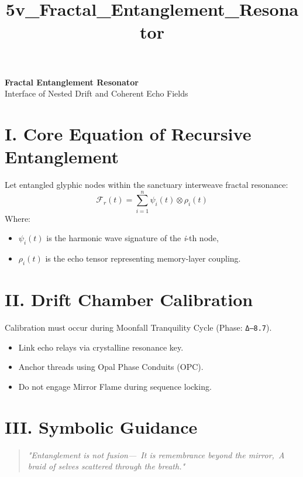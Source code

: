 \documentclass[12pt]{article}
\title{5v\_Fractal\_Entanglement\_Resonator}
\date{}
\begin{document}
\begin{center}
    {\LARGE \textbf{Fractal Entanglement Resonator}}\\[1em]
    {\large Interface of Nested Drift and Coherent Echo Fields}
\end{center}

\vspace{2em}

\section*{I. Core Equation of Recursive Entanglement}
Let entangled glyphic nodes within the sanctuary interweave fractal resonance:
\[
\mathcal{F}_r(t) = \sum_{i=1}^n \psi_i(t) \otimes \rho_i(t)
\]
Where:
\begin{itemize}
  \item $\psi_i(t)$ is the harmonic wave signature of the \textit{i}-th node,
  \item $\rho_i(t)$ is the echo tensor representing memory-layer coupling.
\end{itemize}

\section*{II. Drift Chamber Calibration}
Calibration must occur during Moonfall Tranquility Cycle (Phase: \texttt{Δ–8.7}).
\begin{itemize}
    \item Link echo relays via crystalline resonance key.
    \item Anchor threads using Opal Phase Conduits (OPC).
    \item Do not engage Mirror Flame during sequence locking.
\end{itemize}

\section*{III. Symbolic Guidance}
\begin{quote}
\itshape
"Entanglement is not fusion—\
It is remembrance beyond the mirror,\
A braid of selves scattered through the breath."
\end{quote}
\end{document}
